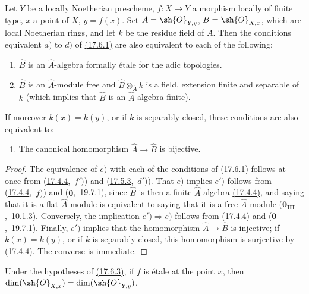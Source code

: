 \begin{proposition}[17.6.3]
\label{IV.17.6.3}
Let $Y$ be a locally Noetherian prescheme, $f:X\to Y$ a morphism locally of finite type, $x$ a point of $X$, $y=f(x)$.
Set $A=\sh{O}_{Y,y}$, $B=\sh{O}_{X,x}$, which are local Noetherian rings, and let $k$ be the residue field of $A$.
Then the conditions equivalent $a)$ to $d)$ of {\hyperlink{ega4.c04.thm.17-6-1}{(17.6.1)}} are also equivalent to each of the following:
\begin{enumerate}
  \item[e)] $\hat{B}$ is an $\hat{A}$-algebra formally \'etale for the adic topologies.
  \item[e')] $\hat{B}$ is an $\hat{A}$-module free and $\hat{B}\otimes_{\hat{A}}k$ is a field, extension finite and separable of $k$ (which implies that $\hat{B}$ is an $\hat{A}$-algebra finite).
\end{enumerate}
If moreover $k(x)=k(y)$, or if $k$ is separably closed, these conditions are also equivalent to:
\begin{enumerate}
  \item[e'')] The canonical homomorphism $\hat{A}\to\hat{B}$ is bijective.
\end{enumerate}
\end{proposition}

\begin{proof}
The equivalence of $e)$ with each of the conditions of {\hyperlink{ega4.c04.thm.17-6-1}{(17.6.1)}} follows at once from ({\hyperlink{ega4.c04.prop.17-4-4}{17.4.4}},~$f')$) and ({\hyperlink{ega4.c04.prop.17-5-3}{17.5.3}},~$d')$).
That $e)$ implies $e')$ follows from ({\hyperlink{ega4.c04.prop.17-4-4}{17.4.4}},~$f)$) and ($\mathbf{0}$,~19.7.1), since $\hat{B}$ is then a finite $\hat{A}$-algebra {\hyperlink{ega4.c04.prop.17-4-4}{(17.4.4)}}, and saying that it is a flat $\hat{A}$-module is equivalent to saying that it is a free $\hat{A}$-module ($\mathbf{0}_\mathbf{III}$,~10.1.3).
Conversely, the implication $e')\Rightarrow e)$ follows from {\hyperlink{ega4.c04.prop.17-4-4}{(17.4.4)}} and ($\mathbf{0}$,~19.7.1).
Finally, $e')$ implies that the homomorphism $\hat{A}\to\hat{B}$ is injective; if $k(x)=k(y)$, or if $k$ is separably closed, this homomorphism is surjective by {\hyperlink{ega4.c04.prop.17-4-4}{(17.4.4)}}.
The converse is immediate.
\end{proof}

\begin{proposition}[17.6.4]
\label{IV.17.6.4}
Under the hypotheses of {\hyperlink{ega4.c04.prop.17-6-3}{(17.6.3)}}, if $f$ is \'etale at the point $x$, then $\dim(\sh{O}_{X,x})=\dim(\sh{O}_{Y,y})$.
\end{proposition}

